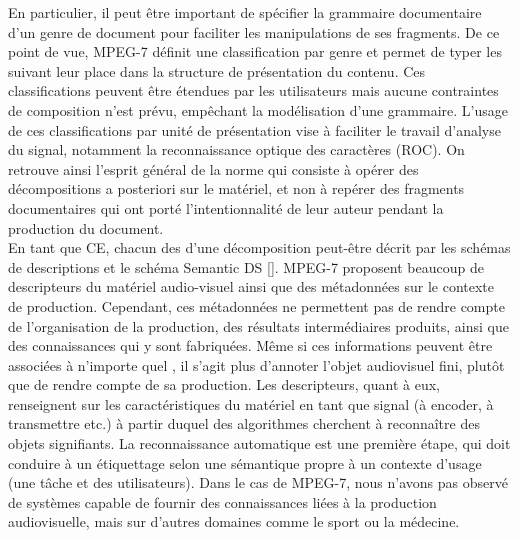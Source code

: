 En particulier, il peut être important de spécifier la grammaire documentaire d'un genre de document pour faciliter les manipulations de ses fragments. 
De ce point de vue, MPEG-7 définit une classification par genre et permet de typer les  suivant leur place dans la structure de présentation du contenu.
Ces classifications peuvent être étendues par les utilisateurs mais aucune contraintes de composition n'est prévu, empêchant la modélisation d'une grammaire.
L'usage de ces classifications par unité de présentation vise à faciliter le travail d'analyse du signal, notamment la reconnaissance optique des caractères (ROC).
On retrouve ainsi l'esprit général de la norme qui consiste à opérer des décompositions a posteriori sur le matériel, et non à repérer des fragments documentaires qui ont porté l'intentionnalité de leur auteur pendant la production du document.\\


En tant que CE, chacun des  d'une décomposition peut-être décrit par les schémas de descriptions et le schéma Semantic DS [].
MPEG-7 proposent beaucoup de descripteurs du matériel audio-visuel ainsi que des métadonnées sur le contexte de production.
Cependant, ces métadonnées ne permettent pas de rendre compte de l'organisation de la production, des résultats intermédiaires produits, ainsi que des connaissances qui y sont fabriquées. 
Même si ces informations peuvent être associées à n'importe quel , il s'agit plus d'annoter l'objet audiovisuel fini, plutôt que de rendre compte de sa production.
Les descripteurs, quant à eux, renseignent sur les caractéristiques du matériel en tant que signal (à encoder, à transmettre etc.) à partir duquel des algorithmes cherchent à reconnaître des objets signifiants.
La reconnaissance automatique est une première étape, qui doit conduire à un étiquettage selon une sémantique propre à un contexte d'usage (une tâche et des utilisateurs).
Dans le cas de MPEG-7, nous n'avons pas observé de systèmes capable de fournir des connaissances liées à la production audiovisuelle, mais sur d'autres domaines comme le sport ou la médecine.

